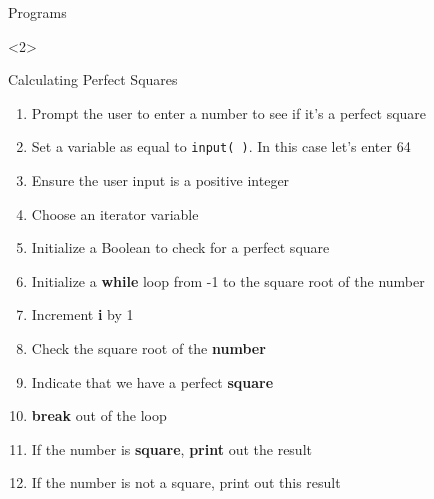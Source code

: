 \documentclass[../main.tex]{subfiles}
\begin{document}
\begin{frame}[fragile]{Programs}

  \begin{onlyenv}<2>
      \begin{exercise}{Calculating Perfect Squares}
    \begin{enumerate} \justifying
    \item Prompt the user to enter a number to see if it's a perfect square
    \item Set a variable as equal to \texttt{input( )}. In this case let's enter 64
    \item Ensure the user input is a positive integer
    \item Choose an iterator variable
    \item Initialize a Boolean to check for a perfect square
    \item Initialize a \textbf{while} loop from -1 to the square root of the number
    \item Increment \textbf{i} by 1
    \item Check the square root of the \textbf{number}
    \item Indicate that we have a perfect \textbf{square}
    \item \textbf{break} out of the loop
    \item If the number is \textbf{square}, \textbf{print} out the result
    \item If the number is not a square, print out this result      
    \end{enumerate}
  \end{exercise}
\end{onlyenv}


\end{frame}
\end{document}
